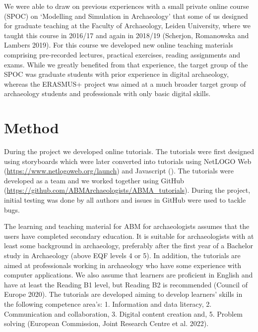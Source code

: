 \documentclass[
]{article}
\begin{document}
We were able to draw on previous experiences with a small private online course (SPOC) on `Modelling and Simulation in Archaeology' that some of us designed for graduate teaching at the Faculty of Archaeology, Leiden University, where we taught this course in 2016/17 and again in 2018/19 (Scherjon, Romanowska and Lambers 2019). For this course we developed new online teaching materials comprising pre-recorded lectures, practical exercises, reading assignments and exams. While we greatly benefited from that experience, the target group of the SPOC was graduate students with prior experience in digital archaeology, whereas the ERASMUS+ project was aimed at a much broader target group of archaeology students and professionals with only basic digital skills.

\hypertarget{method}{%
\section{Method}\label{method}}

During the project we developed online tutorials. The tutorials were first designed using storyboards which were later converted into tutorials using NetLOGO Web (\url{https://www.netlogoweb.org/launch}) and Javascript (). The tutorials were developed as a team and we worked together using GitHub (\url{https://github.com/ABMArchaeologists/ABMA_tutorials}). During the project, initial testing was done by all authors and issues in GitHub were used to tackle bugs.

The learning and teaching material for ABM for archaeologists assumes that the users have completed secondary education. It is suitable for archaeologists with at least some background in archaeology, preferably after the first year of a Bachelor study in Archaeology (above EQF levels 4 or 5). In addition, the tutorials are aimed at professionals working in archaeology who have some experience with computer applications. We also assume that learners are proficient in English and have at least the Reading B1 level, but Reading B2 is recommended (Council of Europe 2020). The tutorials are developed aiming to develop learners' skills in the following competence area's: 1. Information and data literacy, 2. Communication and collaboration, 3. Digital content creation and, 5. Problem solving (European Commission, Joint Research Centre et al. 2022).
\end{document}
